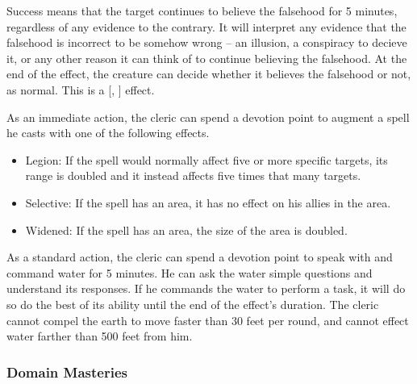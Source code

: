     Success means that the target continues to believe the falsehood for 5 minutes, regardless of any evidence to the contrary.
    It will interpret any evidence that the falsehood is incorrect to be somehow wrong -- an illusion, a conspiracy to decieve it, or any other reason it can think of to continue believing the falsehood.
    At the end of the effect, the creature can decide whether it believes the falsehood or not, as normal.
    This is a [, ] effect.

    As an immediate action, the cleric can spend a devotion point to augment a spell he casts with one of the following effects.
    \begin{itemize}
        \item Legion: If the spell would normally affect five or more specific targets, its range is doubled and it instead affects five times that many targets.
        \item Selective: If the spell has an area, it has no effect on his allies in the area.
        \item Widened: If the spell has an area, the size of the area is doubled.
    \end{itemize}

    As a standard action, the cleric can spend a devotion point to speak with and command water for 5 minutes.
    He can ask the water simple questions and understand its responses.
    If he commands the water to perform a task, it will do so do the best of its ability until the end of the effect's duration.
    The cleric cannot compel the earth to move faster than 30 feet per round, and cannot effect water farther than 500 feet from him.

\subsubsection{Domain Masteries}\label{Domain Masteries}


